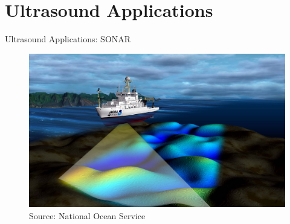 

\newcommand{\TODO}[1]{\textcolor{red}{[\textbf{TODO}: #1]}}
\newcommand{\specialcell}[2][l]{\begin{tabular}[#1]{@{}c@{}}#2\end{tabular}}
\newcommand{\cont}{(cont.)}


\usepackage{animate}
\usepackage{latexsym}
\usepackage{bm}
\usepackage{import}
\usepackage{transparent}

\subtitle{Ultra Sound}




\frame[plain,c]{\titlepage} %

\section{Ultrasound Applications}


\begin{frame}{Ultrasound Applications: SONAR}
    \begin{figure}
        \centering
        \includegraphics[height=0.8\textheight]{images/sonar.jpg}\\
        {\scriptsize Source: National Ocean Service}
    \end{figure}
\end{frame}


